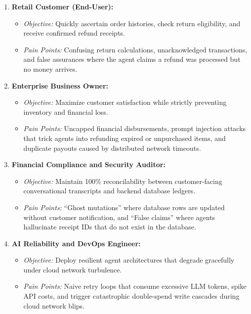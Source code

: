 \begin{enumerate}
    \item \textbf{Retail Customer (End-User):}
    \begin{itemize}
        \item \textit{Objective:} Quickly ascertain order histories, check return eligibility, and receive confirmed refund receipts.
        \item \textit{Pain Points:} Confusing return calculations, unacknowledged transactions, and false assurances where the agent claims a refund was processed but no money arrives.
    \end{itemize}

    \item \textbf{Enterprise Business Owner:}
    \begin{itemize}
        \item \textit{Objective:} Maximize customer satisfaction while strictly preventing inventory and financial loss.
        \item \textit{Pain Points:} Uncapped financial disbursements, prompt injection attacks that trick agents into refunding expired or unpurchased items, and duplicate payouts caused by distributed network timeouts.
    \end{itemize}

    \item \textbf{Financial Compliance and Security Auditor:}
    \begin{itemize}
        \item \textit{Objective:} Maintain 100\% reconcilability between customer-facing conversational transcripts and backend database ledgers.
        \item \textit{Pain Points:} ``Ghost mutations'' where database rows are updated without customer notification, and ``False claims'' where agents hallucinate receipt IDs that do not exist in the database.
    \end{itemize}

    \item \textbf{AI Reliability and DevOps Engineer:}
    \begin{itemize}
        \item \textit{Objective:} Deploy resilient agent architectures that degrade gracefully under cloud network turbulence.
        \item \textit{Pain Points:} Naive retry loops that consume excessive LLM tokens, spike API costs, and trigger catastrophic double-spend write cascades during cloud network blips.
    \end{itemize}
\end{enumerate}

